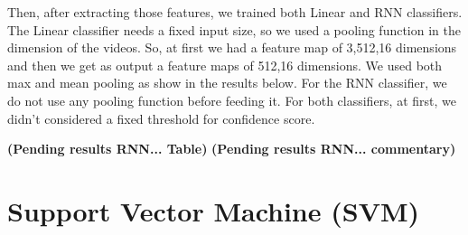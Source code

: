 Then, after extracting those features, we trained both Linear and RNN classifiers. The Linear classifier needs a fixed input size,
so we used a pooling function in the dimension of the videos. So, at first we had a feature map of 3,512,16 dimensions and then we
get as output a feature maps of 512,16 dimensions. We used both max and mean pooling as show in the results below. For the RNN
classifier, we do not use any pooling function before feeding it. For both classifiers, at first, we didn't considered a fixed
threshold for confidence score.

\textbf{(Pending results RNN... Table)}
\textbf{(Pending results RNN... commentary)}

\section{Support Vector Machine (SVM)}
